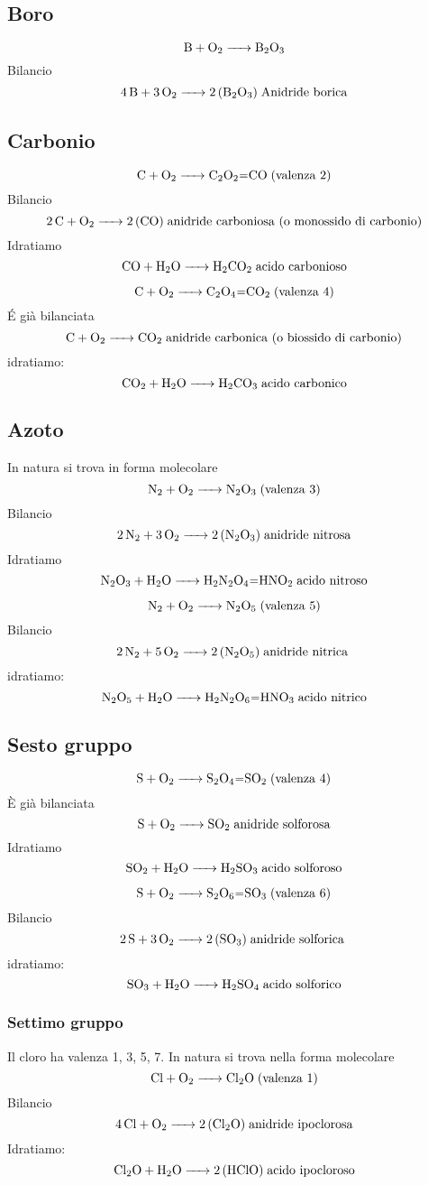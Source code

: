 \subsection{Boro}
$$\ce{B + O_2 -> B_2O_3}$$
Bilancio
$$\ce{4 B + 3 O_2 -> 2 (B_2O_3)} \; \text{Anidride borica}$$
\subsection{Carbonio}
$$\ce{C + O_2 -> C_2O_2=CO} \; \text{(valenza 2)}$$ Bilancio
$$\ce{2 C + O_2 -> 2 (CO)} \; \text{anidride carboniosa (o monossido di carbonio)}$$
Idratiamo
$$\ce{CO + H_2O -> H_2CO_2} \; \text{acido carbonioso}$$

$$\ce{C + O_2 -> C_2O_4=CO_2} \; \text{(valenza 4)}$$ É già bilanciata
$$\ce{C + O_2 -> CO_2} \; \text{anidride carbonica (o biossido di carbonio)}$$
idratiamo:
$$\ce{CO_2 + H_2O -> H_2CO_3} \; \text{acido carbonico}$$
\subsection{Azoto}
In natura si trova in forma molecolare 
$$\ce{N_2 + O_2 -> N_2O_3} \; \text{(valenza 3)}$$ Bilancio
$$\ce{2 N_2 + 3 O_2 -> 2 (N_2O_3)} \; \text{anidride nitrosa}$$
Idratiamo
$$\ce{N_2O_3 + H_2O -> H_2N_2O_4=HNO_2} \; \text{acido nitroso}$$

$$\ce{N_2 + O_2 -> N_2O_5} \; \text{(valenza 5)}$$ Bilancio
$$\ce{2 N_2 + 5 O_2 -> 2 (N_2O_5)} \; \text{anidride nitrica }$$
idratiamo:
$$\ce{N_2O_5 + H_2O -> H_2N_2O_6=HNO_3} \; \text{acido nitrico}$$
\subsection{Sesto gruppo}
$$\ce{S + O_2 -> S_2O_4=SO_2} \; \text{(valenza 4)}$$ È già bilanciata
$$\ce{S + O_2 -> SO_2} \; \text{anidride solforosa}$$
Idratiamo
$$\ce{SO_2 + H_2O -> H_2SO_3} \; \text{acido solforoso}$$

$$\ce{S + O_2 -> S_2O_6=SO_3} \; \text{(valenza 6)}$$ Bilancio
$$\ce{2 S + 3 O_2 -> 2 (SO_3)} \; \text{anidride solforica }$$
idratiamo:
$$\ce{SO_3 + H_2O -> H_2SO_4} \; \text{acido solforico}$$
\subsubsection{Settimo gruppo}
Il cloro ha valenza 1, 3, 5, 7. In natura si trova nella forma molecolare 
$$\ce{Cl + O_2 -> Cl_2O} \; \text{(valenza 1)}$$ Bilancio
$$\ce{4 Cl + O_2 -> 2 (Cl_2O)} \; \text{anidride ipoclorosa}$$
Idratiamo:
$$\ce{Cl_2O + H_2O -> 2 (HClO)} \; \text{acido ipocloroso}$$

